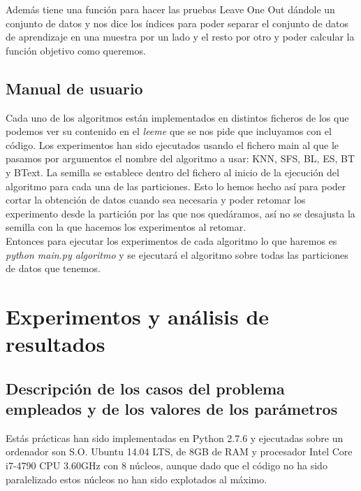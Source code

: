 \documentclass[10pt,a4paper]{article}
\begin{document}
Además tiene una función para hacer las pruebas Leave One Out dándole un conjunto de datos y nos dice los índices para poder separar el conjunto de datos de aprendizaje en una muestra por un lado y el resto por otro y poder calcular la función objetivo como queremos.\\

\subsection{\color[rgb]{0.0,0.0,0.51}Manual de usuario}

Cada uno de los algoritmos están implementados en distintos ficheros de los que podemos ver su contenido en el \textit{leeme} que se nos pide que incluyamos con el código. Los experimentos han sido ejecutados usando el fichero main al que le pasamos por argumentos el nombre del algoritmo a usar: KNN, SFS, BL, ES, BT y BText. La semilla se establece dentro del fichero al inicio de la ejecución del algoritmo para cada una de las particiones. Esto lo hemos hecho así para poder cortar la obtención de datos cuando sea necesaria y poder retomar los experimento desde la partición por las que nos quedáramos, así no se desajusta la semilla con la que hacemos los experimentos al retomar.\\

Entonces para ejecutar los experimentos de cada algoritmo lo que haremos es \textit{python main.py algoritmo} y se ejecutará el algoritmo sobre todas las particiones de datos que tenemos.\\

\section{\color[rgb]{0.0,0.0,0.21}Experimentos y análisis de resultados}

\subsection{\color[rgb]{0.0,0.0,0.51}Descripción de los casos del problema empleados y de los valores de los parámetros}


Estás prácticas han sido implementadas en Python 2.7.6 y ejecutadas sobre un ordenador son S.O. Ubuntu 14.04 LTS, de 8GB de RAM y procesador Intel Core i7-4790 CPU 3.60GHz con 8 núcleos, aunque dado que el código no ha sido paralelizado estos núcleos no han sido explotados al máximo.\\
\end{document}
